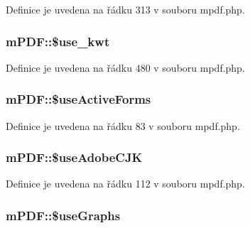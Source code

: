 Definice je uvedena na řádku 313 v souboru mpdf.\-php.

\hypertarget{classm_p_d_f_ab017f6ed4e252bf723479e0fa70660d9}{
\subsubsection[{\$use\-\_\-kwt}]{\setlength{\rightskip}{0pt plus 5cm}m\-P\-D\-F\-::\$use\-\_\-kwt}}\label{classm_p_d_f_ab017f6ed4e252bf723479e0fa70660d9}


Definice je uvedena na řádku 480 v souboru mpdf.\-php.

\hypertarget{classm_p_d_f_a7ea610858f89932f0ed5c359aebda0a4}{
\subsubsection[{\$use\-Active\-Forms}]{\setlength{\rightskip}{0pt plus 5cm}m\-P\-D\-F\-::\$use\-Active\-Forms}}\label{classm_p_d_f_a7ea610858f89932f0ed5c359aebda0a4}


Definice je uvedena na řádku 83 v souboru mpdf.\-php.

\hypertarget{classm_p_d_f_aa5d4b32dd786a4fd1b7127ff2ca257a0}{
\subsubsection[{\$use\-Adobe\-C\-J\-K}]{\setlength{\rightskip}{0pt plus 5cm}m\-P\-D\-F\-::\$use\-Adobe\-C\-J\-K}}\label{classm_p_d_f_aa5d4b32dd786a4fd1b7127ff2ca257a0}


Definice je uvedena na řádku 112 v souboru mpdf.\-php.

\hypertarget{classm_p_d_f_af27db575d81609f526052f2918f52a7f}{
\subsubsection[{\$use\-Graphs}]{\setlength{\rightskip}{0pt plus 5cm}m\-P\-D\-F\-::\$use\-Graphs}}\label{classm_p_d_f_af27db575d81609f526052f2918f52a7f}


